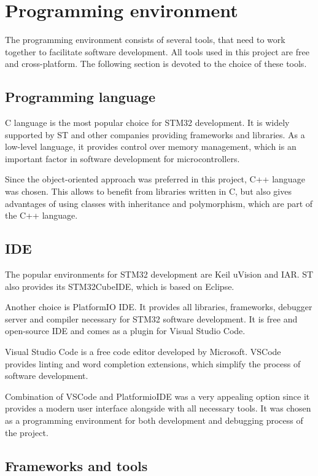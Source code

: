 \documentclass[a4paper,twoside,12pt]{book}
\begin{document}
\section{Programming environment}
The programming environment consists of several tools,
that need to work together to facilitate software development.
All tools used in this project are free and cross-platform.
The following section is devoted to the choice of these tools.

\subsection{Programming language}

C language is the most popular choice for STM32 development.
It is widely supported by ST and other companies providing frameworks and libraries.
As a low-level language, it provides control over memory management,
which is an important factor in software development for microcontrollers.

Since the object-oriented approach was preferred in this project,
C++ language was chosen.
This allows to benefit from libraries written in C,
but also gives advantages of using classes with inheritance and polymorphism,
which are part of the C++ language.

\subsection{IDE}

The popular environments for STM32 development are Keil uVision and IAR.
ST also provides its STM32CubeIDE, which is based on Eclipse.

Another choice is PlatformIO IDE.
It provides all libraries, frameworks,
debugger server and compiler necessary for STM32 software development.
It is free and open-source IDE and
comes as a plugin for Visual Studio Code.

Visual Studio Code is a free code editor developed by Microsoft.
VSCode provides linting and word completion extensions,
which simplify the process of software development.

Combination of VSCode and PlatformioIDE was a very appealing option
since it provides a modern user interface alongside with all necessary tools.
It was chosen as a programming environment for both development and debugging
process of the project.

\subsection{Frameworks and tools}
\end{document}

